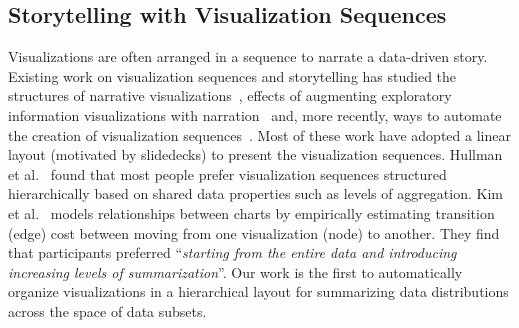 \subsection{Storytelling with Visualization Sequences}
Visualizations are often arranged in a sequence to narrate a data-driven story. Existing work on visualization sequences and storytelling has studied the structures of narrative visualizations~\cite{Segel2010,Hullman2017}, effects of augmenting exploratory information visualizations with narration~\cite{Boy2015} and, more recently, ways to automate the creation of visualization sequences~\cite{Hullman2013,Kim2017}. Most of these work have adopted a linear layout (motivated by slidedecks) to present the visualization sequences. Hullman et al.~\cite{Hullman2017} found that most people prefer visualization sequences structured hierarchically based on shared data properties such as levels of aggregation. Kim et al.~\cite{Kim2017} models relationships between charts by empirically estimating transition (edge) cost between moving from one visualization (node) to another. They find that participants preferred ``\textit{starting from the entire data and introducing increasing levels of summarization}''. Our work is the first to automatically organize visualizations in a hierarchical layout for summarizing data distributions across the space of data subsets.


